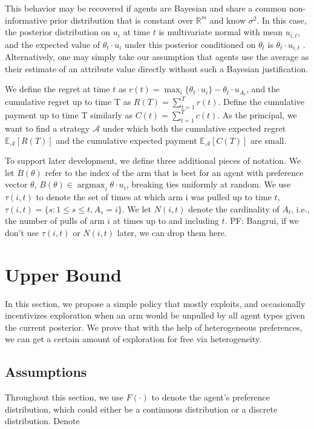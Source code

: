 \documentclass{article}
\newcommand{\argmax}{\mathop{\mathrm{argmax}}}
\newcommand{\pfcomment}[1]{{\color{blue}PF: #1}}
\begin{document}
This behavior may be recovered if agents are Bayesian and share a common non-informative prior distribution that is constant over $\mathbb{R}^m$ and know $\sigma^2$.  In this case, the posterior distribution on $u_{i}$ at time $t$ is multivariate normal with mean $u_{i,t}$, and the expected value of $\theta_t \cdot u_i$ under this posterior conditioned on $\theta_t$ is $\theta_t \cdot u_{i,t}$ \cite[equation 2.13 in section 2.5]{Ge04}.  Alternatively, one may simply take our assumption that agents use the average as their estimate of an attribute value directly without such a Bayesian justification.

We define the regret at time $t$ as $r(t)=\max_{i}\{\theta_{t}\cdot u_{i}\}-\theta_t\cdot u_{A_t}$, and the cumulative regret up to time T as $R(T)=\sum_{t=1}^{T}r(t)$. Define the cumulative payment up to time T similarly as $C(t)=\sum_{t=1}^{T}c(t)$. 
As the principal, we want to find a strategy $\mathcal{A}$ under which both the cumulative expected regret $\mathbb{E}_{\mathcal{A}}[R(T)]$ and the cumulative expected payment $\mathbb{E}_{\mathcal{A}}[C(T)]$ are small.

To support later development, we define three additional pieces of notation.
We let $B(\theta)$ refer to the index of the arm that is best for an agent with preference vector $\theta$, $B(\theta) \in \argmax_i \theta \cdot u_i$, breaking ties uniformly at random. 
We use $\tau(i,t)$ to denote the set of times at which arm i was pulled up to time $t$,
$\tau(i,t) = \{ s : 1 \le s \le t, A_s = i \}$.
We let $N(i,t)$ denote the cardinality of $A_t$, i.e., the number of pulls of arm $i$ at times up to and including $t$.
\pfcomment{Bangrui, if we don't use $\tau(i,t)$ or $N(i,t)$ later, we can drop them here.}

\section{Upper Bound}
\label{sec:ub}

In this section, we propose a simple policy that mostly exploits, and occasionally incentivizes exploration when an arm would be unpulled by all agent types given the current posterior. We prove that with the help of heterogeneous preferences, we can get a certain amount of exploration for free via heterogeneity. 



\subsection{Assumptions}
Throughout this section, we use $F(\cdot)$ to denote the agent's preference distribution, which could either be a continuous distribution or a discrete distribution. Denote
\end{document}
